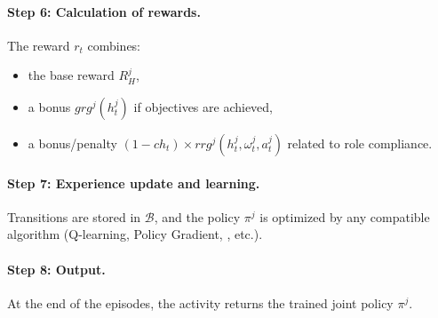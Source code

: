 \paragraph{Step 6: Calculation of rewards.}
The reward $r_t$ combines:
\begin{itemize}
  \item the base reward $R^j_H$,
  \item a bonus $grg^j(h^j_t)$ if objectives are achieved,
  \item a bonus/penalty $(1-ch_t)\times rrg^j(h^j_t,\omega_t^j,a_t^j)$ related to role compliance.
\end{itemize}

\paragraph{Step 7: Experience update and learning.}
Transitions are stored in $\mathcal{B}$, and the policy $\pi^j$ is optimized by any compatible  algorithm (Q-learning, Policy Gradient, , etc.).

\paragraph{Step 8: Output.}
At the end of the episodes, the activity returns the trained joint policy $\pi^j$.


